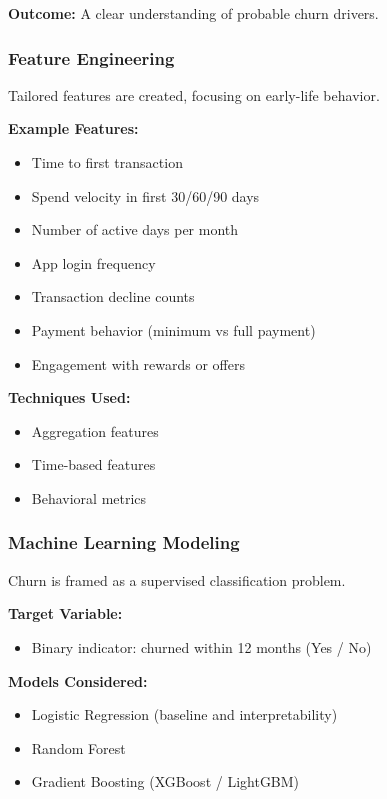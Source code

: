 \documentclass[10pt,a4paper]{article}
\begin{document}
	\textbf{Outcome:} A clear understanding of probable churn drivers.
	
	\subsubsection{Feature Engineering}
	
	Tailored features are created, focusing on early-life behavior.
	
	\textbf{Example Features:}
	\begin{itemize}
	    \item Time to first transaction
	    \item Spend velocity in first 30/60/90 days
	    \item Number of active days per month
	    \item App login frequency
	    \item Transaction decline counts
	    \item Payment behavior (minimum vs full payment)
	    \item Engagement with rewards or offers
	\end{itemize}
	
	\textbf{Techniques Used:}
	\begin{itemize}
	    \item Aggregation features
	    \item Time-based features
	    \item Behavioral metrics
	\end{itemize}
	
	\subsubsection{Machine Learning Modeling}
	
	Churn is framed as a supervised classification problem.
	
	\textbf{Target Variable:}
	\begin{itemize}
	    \item Binary indicator: churned within 12 months (Yes / No)
	\end{itemize}
	
	\textbf{Models Considered:}
	\begin{itemize}
	    \item Logistic Regression (baseline and interpretability)
	    \item Random Forest
	    \item Gradient Boosting (XGBoost / LightGBM)
	\end{itemize}
	
\end{document}
